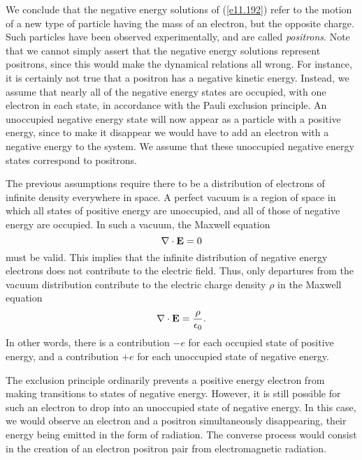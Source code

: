 We conclude that the negative energy solutions of (\ref{e11.192}) refer to the motion of a new type of particle having the
mass of an electron, but the opposite charge. Such particles have been observed experimentally, and are called {\em positrons}. 
Note that we cannot simply assert that the negative energy solutions represent positrons, since this would make the dynamical
relations all wrong. For instance, it is certainly not true that a positron has a negative kinetic energy. Instead, we assume
that nearly all of the negative energy states are occupied, with one electron in each state, in accordance with the Pauli
exclusion principle. An unoccupied negative energy state will now appear as a particle with a positive energy, since to make
it disappear we would have to add an electron with a negative energy to the system. We assume that these unoccupied negative
energy states correspond to positrons. 

The previous assumptions require there to be a distribution of electrons of infinite density everywhere in space. A perfect
vacuum is a region of space in which all states of positive energy are unoccupied, and all of those of negative energy are occupied. 
In such a vacuum, the Maxwell  equation
\begin{equation}
\nabla\cdot {\bf E} = 0
\end{equation}
must be valid. This implies that the infinite distribution of negative energy electrons does not contribute to the
electric field. Thus, only departures from the vacuum distribution contribute to the electric charge density $\rho$ in the 
Maxwell equation
\begin{equation}
\nabla\cdot{\bf E} = \frac{\rho}{\epsilon_0}.
\end{equation}
In other words, there is a contribution $-e$ for each occupied state of positive energy, and a contribution $+e$ for each unoccupied
state of negative energy. 

The exclusion principle ordinarily prevents a positive energy electron from making transitions to states of negative energy.
However, it is still possible for such an electron to drop into an unoccupied state of negative energy. In this case, we would
observe an electron and a positron simultaneously disappearing, their energy being emitted in the form of radiation. The
converse process would consist in the creation of an electron positron pair from electromagnetic radiation. 

